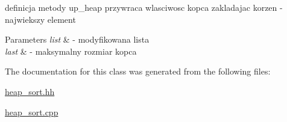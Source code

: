 definicja metody up\+\_\+heap przywraca wlasciwosc kopca zakladajac korzen -\/ najwiekszy element 


\begin{DoxyParams}{Parameters}
{\em list} & -\/ modyfikowana lista \\
\hline
{\em last} & -\/ maksymalny rozmiar kopca \\
\hline
\end{DoxyParams}


The documentation for this class was generated from the following files\+:\begin{DoxyCompactItemize}
\item 
\hyperlink{heap__sort_8hh}{heap\+\_\+sort.\+hh}\item 
\hyperlink{heap__sort_8cpp}{heap\+\_\+sort.\+cpp}\end{DoxyCompactItemize}
